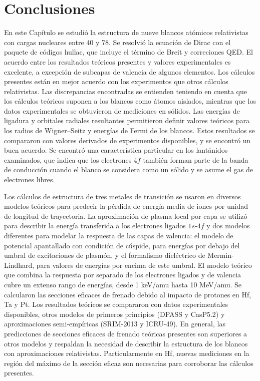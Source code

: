 \section{Conclusiones}
\label{sec:conclu-heavy}

En este Capítulo se estudió la estructura de nueve blancos atómicos 
relativistas con cargas nucleares entre 40 y 78. Se resolvió la 
ecuación de Dirac con el paquete de códigos {\sc hullac}, que incluye 
el término de Breit y correciones QED. El acuerdo entre los resultados 
teóricos presentes y valores experimentales es excelente, a excepción de 
subcapas de valencia de algunos elementos. Los cálculos presentes 
están en mejor acuerdo con los experimentos que otros cálculos 
relativistas. Las discrepancias encontradas se entienden teniendo en 
cuenta que los cálculos teóricos suponen a los blancos como átomos 
aislados, mientras que los datos experimentales se obtuvieron de 
mediciones en sólidos. Las energías de ligadura y orbitales radiales 
resultantes permitieron definir valores teóricos para los radios de 
Wigner--Seitz y energías de Fermi de los blancos. Estos resultados se 
compararon con valores derivados de experimentos disponibles, y se 
encontró un buen acuerdo. Se encontró una característica particular en 
los lantánidos examinados, que indica que los electrones $4f$ también 
forman parte de la banda de conducción cuando el blanco se considera 
como un sólido y se asume el gas de electrones libres.

Los cálculos de estructura de tres metales de transición se usaron en 
diversos modelos teóricos para predecir la pérdida de energía media de 
iones por unidad de longitud de trayectoria. La aproximación de plasma 
local por capa se utilizó para describir la energía transferida a los 
electrones ligados $1s$-$4f$ y dos modelos diferentes para modelar la 
respuesta de las capas de valencia: el modelo de potencial apantallado 
con condición de cúspide, para energías por debajo del umbral de 
excitaciones de plasmón, y el formalismo dieléctrico de Mermin-Lindhard, 
para valores de energías por encima de este umbral. El modelo teórico 
que combina la respuesta por separado de los electrones ligados y de 
valencia cubre un extenso rango de energías, desde 1 keV/amu hasta 
10 MeV/amu. Se calcularon las secciones eficaces de frenado debido al 
impacto de protones en Hf, Ta y Pt. Los resultados teóricos se 
compararon con datos experimentales disponibles, otros modelos de 
primeros principios (DPASS y CasP5.2) y aproximaciones semi-empíricas 
(SRIM-2013 y ICRU-49). En general, las predicciones de secciones 
eficaces de frenado teóricas presentes son superiores a otros modelos y 
respaldan la necesidad de describir la estructura de los blancos con 
aproximaciones relativistas. Particularmente en Hf, nuevas mediciones en 
la región del máximo de la sección eficaz son necesarias para corroborar
las cálculos presentes.



